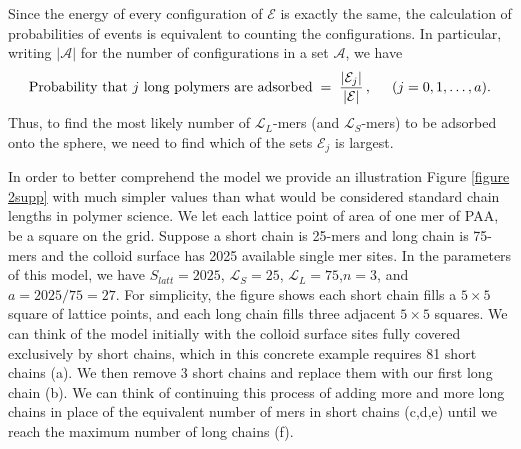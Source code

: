 \documentclass[journal=mamobx,manuscript=article]{achemso}
\newcommand{\leng}{\mathcal{L}}
\begin{document}
Since the energy of every configuration of $\mathcal{E}$ is exactly the same,
the calculation of probabilities of events is equivalent to counting the configurations.
In particular, writing $|\mathcal{A}|$ for the number of configurations in a set $\mathcal{A}$, we have
\[
    \hbox{Probability that $j$ long polymers are adsorbed}  \;=\; 
    \frac{|\mathcal{E}_j|}{|\mathcal{E}|}\,,   \hspace{5mm}(j=0,1,\ldots,a).
\]
Thus, to find the most likely number of $\leng_L$-mers (and $\leng_S$-mers) to be adsorbed onto the sphere,
we need to find which of the sets $\mathcal{E}_j$ is largest.


In order to better comprehend the model we provide an illustration Figure \ref{figure 2supp} with much simpler values than what would be considered standard chain lengths in polymer science. We let each lattice point of area of one mer of PAA, be a square on the grid. 
Suppose a short chain is %
25-mers and long chain is 75-mers and the colloid surface has 2025 available single mer sites.
In the parameters of this model, we have 
$S_{latt}=2025$, $\leng_S=25$,
$\leng_L=75$,$n=3$, and $a=2025/75=27$.
For simplicity, the figure shows each short chain
fills a $5\times 5$ square of lattice points, and each
long chain fills three adjacent $5\times 5$ squares.
We can think of the model initially with the colloid surface sites fully covered exclusively by short chains, which in this concrete example requires 81 short chains (a). We then remove 3 short chains and replace them with our first long chain (b). 
We can think of continuing this process of adding more and more long chains in place of the equivalent number of mers in short chains (c,d,e) until we reach the maximum number of long chains (f).
\end{document}
